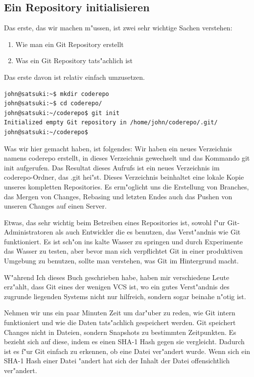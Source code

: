 \subsection{Ein Repository initialisieren}
Das erste, das wir machen m"ussen, ist zwei sehr wichtige Sachen verstehen:

\begin{enumerate}
  \item Wie man ein Git Repository erstellt
  \item Was ein Git Repository tats"achlich ist
\end{enumerate}

Das erste davon ist relativ einfach umzusetzen.

\begin{Verbatim}
john@satsuki:~$ mkdir coderepo
john@satsuki:~$ cd coderepo/
john@satsuki:~/coderepo$ git init
Initialized empty Git repository in /home/john/coderepo/.git/
john@satsuki:~/coderepo$
\end{Verbatim}

Was wir hier gemacht haben, ist folgendes: Wir haben ein neues Verzeichnis namens coderepo erstellt, in dieses Verzeichnis gewechselt und das Kommando git init aufgerufen. Das Resultat dieses Aufrufs ist ein neues Verzeichnis im coderepo-Ordner, das .git hei"st. Dieses Verzeichnis beinhaltet eine lokale Kopie unseres kompletten Repositories. Es erm"oglicht uns die Erstellung von Branches, das Mergen von Changes, Rebasing und letzten Endes auch das Pushen von unseren Changes auf einen Server.

Etwas, das sehr wichtig beim Betreiben eines Repositories ist, sowohl f"ur Git-Administratoren als auch Entwickler die es benutzen, das Verst"andnis wie Git funktioniert. Es ist sch"on ins kalte Wasser zu springen und durch Experimente das Wasser zu testen, aber bevor man sich verpflichtet Git in einer produktiven Umgebung zu benutzen, sollte man verstehen, was Git im Hintergrund macht.

W"ahrend Ich dieses Buch geschrieben habe, haben mir verschiedene Leute erz"ahlt, dass Git eines der wenigen VCS ist, wo ein gutes Verst"andnis des zugrunde liegenden Systems nicht nur hilfreich, sondern sogar beinahe n"otig ist.

Nehmen wir uns ein paar Minuten Zeit um dar"uber zu reden, wie Git intern funktioniert und wie die Daten tats"achlich gespeichert werden. Git speichert Changes nicht in Dateien, sondern Snapshots zu bestimmten Zeitpunkten. Es bezieht sich auf diese, indem es einen SHA-1 Hash gegen sie vergleicht. Dadurch ist es f"ur Git einfach zu erkennen, ob eine Datei ver"andert wurde. Wenn sich ein SHA-1 Hash einer Datei "andert hat sich der Inhalt der Datei offensichtlich ver"andert.


